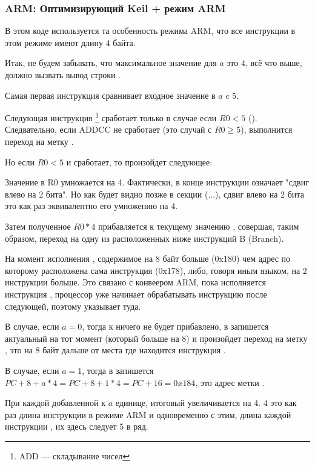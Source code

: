 ﻿%
\subsubsection{ARM: Оптимизирующий Keil + режим ARM}



В этом коде используется та особенность режима ARM, что все инструкции в этом режиме имеют длину 4 байта.

Итак, не будем забывать, что максимальное значение для $a$ это $4$, всё что выше, должно вызвать
вывод строки .

Самая первая инструкция  сравнивает входное значение в $a$ c $5$.

Следующая инструкция \footnote{ADD --- складывание чисел}
сработает только в случае если $R0 < 5$
(). Следвательно, если ADDCC не сработает (это случай с $R0 \geq 5$),
выполнится переход на метку .

Но если $R0 < 5$ и  сработает, то произойдет следующее:

Значение в R0 умножается на 4. 
Фактически,  в конце инструкции означает "сдвиг влево на 2 бита". Но как будет видно позже 
в секции (...), сдвиг влево на 2 бита это как раз эквивалентно его умножению на 4.

Затем полученное $R0*4$ прибавляется к текущему значению \PC, совершая, таким образом, 
переход на одну из расположенных ниже инструкций B (Branch).

На момент исполнения , содержимое \PC на 8 байт больше (0x180) чем адрес по которому 
расположена сама
инструкция  (0x178), либо, говоря иным языком, на 2 инструкции больше. 
Это связано с конвеером ARM,
пока исполняется инструкция , процессор уже начинает обрабатывать инструкцию после следующей, 
поэтому
\PC указывает туда.

В случае, если $a=0$, тогда к \PC ничего не будет прибавлено, в \PC запишется актуальный на тот момент \PC
(который больше на 8) и произойдет переход на метку , 
это на 8 байт дальше от места где находится инструкция . 

В случае, если $a=1$, тогда в \PC запишется $PC+8+a*4 = PC+8+1*4 = PC+16 = 0x184$, это адрес метки
.

При каждой добавленной к $a$ единице, итоговый \PC увеличивается на 4. 4 это как раз длина инструкции 
в режиме ARM и одновременно с этим, длина каждой инструкции , их здесь следует 5 в ряд.

